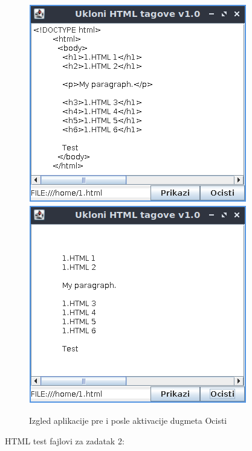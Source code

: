 \documentclass[]{article}
\begin{document}
\begin{enumerate}
  \begin{figure}[H]
    \centering
    \includegraphics[scale=0.7]{fig1.PNG}
    \includegraphics[scale=0.7]{fig2.PNG}
    \label{fig2}
    \caption{Izgled aplikacije pre i posle aktivacije dugmeta Ocisti}
  \end{figure}
\end{enumerate}


\newpage

HTML test fajlovi za zadatak 2:
\end{document}
